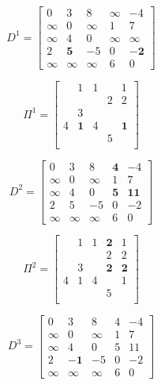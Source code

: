 			\begin{equation}
				D^1 = \begin{bmatrix}
					0 & 3 & 8 &\infty & -4 \\
					\infty & 0  &\infty & 1 & 7 \\
					\infty & 4 & 0 &\infty &\infty\\
					2 & \mathbf{5} & -5 & 0 &\mathbf{-2}\\
					\infty & \infty & \infty & 6 & 0
				\end{bmatrix}
			\end{equation}

			\begin{equation}
				\Pi^1 = \begin{bmatrix}
					& 1 & 1 & & 1 \\
					& & & 2 & 2\\
					& 3 & & & \\
					4 & \mathbf{1} & 4 & & \mathbf{1}\\
					& & & 5 & \\
				\end{bmatrix}
			\end{equation}

			\begin{equation}
				D^2 = \begin{bmatrix}
					0 & 3 & 8 &\mathbf{4} & -4 \\
					\infty & 0  &\infty & 1 & 7 \\
					\infty & 4 & 0 &\mathbf{5} &\mathbf{11}\\
					2 & 5 & -5 & 0 &-2\\
					\infty & \infty & \infty & 6 & 0
				\end{bmatrix}
			\end{equation}

			\begin{equation}
				\Pi^2 = \begin{bmatrix}
					& 1 & 1 & \mathbf{2} & 1 \\
					& & & 2 & 2\\
					& 3 & & \mathbf{2} & \mathbf{2} \\
					4 & 1 & 4 & & 1\\
					& & & 5 & \\
				\end{bmatrix}
			\end{equation}

			\begin{equation}
				D^3 = \begin{bmatrix}
					0 & 3 & 8 & 4 & -4 \\
					\infty & 0  &\infty & 1 & 7 \\
					\infty & 4 & 0 & 5 & 11\\
					2 & \mathbf{-1} & -5 & 0 &-2\\
					\infty & \infty & \infty & 6 & 0
				\end{bmatrix}
			\end{equation}

